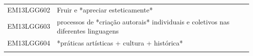 \documentclass[12pt]{extarticle}
\begin{document}
\begin{longtable}{ll}
EM13LGG602 & Fruir e *apreciar esteticamente*                                                                                                                                                                                                                                                                                                                                                                                                                                                                                                                                                                                                                                                                                                                                                                                      \\
\rowcolor[HTML]{FFF} 
EM13LGG603 & processos de *criação autorais* individuais e coletivos nas diferentes linguagens                                                                                                                                                                                                                                                                                                                                                                                                                                                                                                                                                                                                                                                                                                                                     \\
\rowcolor[HTML]{E0F7FA} 
EM13LGG604 & *práticas artísticas + cultura + histórica*                                                                                                                                                                                                                                                                                                                                                                                                                                                                                                                                                                                                                                                                                                                                                                           \\
\rowcolor[HTML]{FFF} 

\end{longtable}
\end{document}
